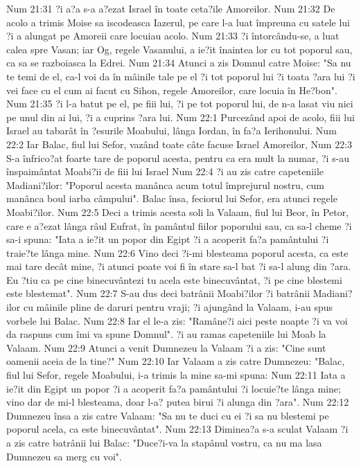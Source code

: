 Num 21:31  ?i a?a s-a a?ezat Israel în toate ceta?ile Amoreilor.
Num 21:32  De acolo a trimis Moise sa iscodeasca Iazerul, pe care l-a luat împreuna cu satele lui ?i a alungat pe Amoreii care locuiau acolo.
Num 21:33  ?i întorcându-se, a luat calea spre Vasan; iar Og, regele Vasanului, a ie?it înaintea lor cu tot poporul sau, ca sa se razboiasca la Edrei.
Num 21:34  Atunci a zis Domnul catre Moise: "Sa nu te temi de el, ca-l voi da în mâinile tale pe el ?i tot poporul lui ?i toata ?ara lui ?i vei face cu el cum ai facut cu Sihon, regele Amoreilor, care locuia în He?bon".
Num 21:35  ?i l-a batut pe el, pe fiii lui, ?i pe tot poporul lui, de n-a lasat viu nici pe unul din ai lui, ?i a cuprins ?ara lui.
Num 22:1  Purcezând apoi de acolo, fiii lui Israel au tabarât în ?esurile Moabului, lânga Iordan, în fa?a Ierihonului.
Num 22:2  Iar Balac, fiul lui Sefor, vazând toate câte facuse Israel Amoreilor,
Num 22:3  S-a înfrico?at foarte tare de poporul acesta, pentru ca era mult la numar, ?i s-au înspaimântat Moabi?ii de fiii lui Israel
Num 22:4  ?i au zis catre capeteniile Madiani?ilor: "Poporul acesta manânca acum totul împrejurul nostru, cum manânca boul iarba câmpului". Balac însa, feciorul lui Sefor, era atunci regele Moabi?ilor.
Num 22:5  Deci a trimis acesta soli la Valaam, fiul lui Beor, în Petor, care e a?ezat lânga râul Eufrat, în pamântul fiilor poporului sau, ca sa-l cheme ?i sa-i spuna: "Iata a ie?it un popor din Egipt ?i a acoperit fa?a pamântului ?i traie?te lânga mine.
Num 22:6  Vino deci ?i-mi blesteama poporul acesta, ca este mai tare decât mine, ?i atunci poate voi fi în stare sa-l bat ?i sa-l alung din ?ara. Eu ?tiu ca pe cine binecuvântezi tu acela este binecuvântat, ?i pe cine blestemi este blestemat".
Num 22:7  S-au dus deci batrânii Moabi?ilor ?i batrânii Madiani?ilor cu mâinile pline de daruri pentru vraji; ?i ajungând la Valaam, i-au spus vorbele lui Balac.
Num 22:8  Iar el le-a zis: "Ramâne?i aici peste noapte ?i va voi da raspuns cum îmi va spune Domnul". ?i au ramas capeteniile lui Moab la Valaam.
Num 22:9  Atunci a venit Dumnezeu la Valaam ?i a zis: "Cine sunt oamenii aceia de la tine?"
Num 22:10  Iar Valaam a zis catre Dumnezeu: "Balac, fiul lui Sefor, regele Moabului, i-a trimis la mine sa-mi spuna:
Num 22:11  Iata a ie?it din Egipt un popor ?i a acoperit fa?a pamântului ?i locuie?te lânga mine; vino dar de mi-l blesteama, doar l-a? putea birui ?i alunga din ?ara".
Num 22:12  Dumnezeu însa a zis catre Valaam: "Sa nu te duci cu ei ?i sa nu blestemi pe poporul acela, ca este binecuvântat".
Num 22:13  Diminea?a s-a sculat Valaam ?i a zis catre batrânii lui Balac: "Duce?i-va la stapânul vostru, ca nu ma lasa Dumnezeu sa merg cu voi".
